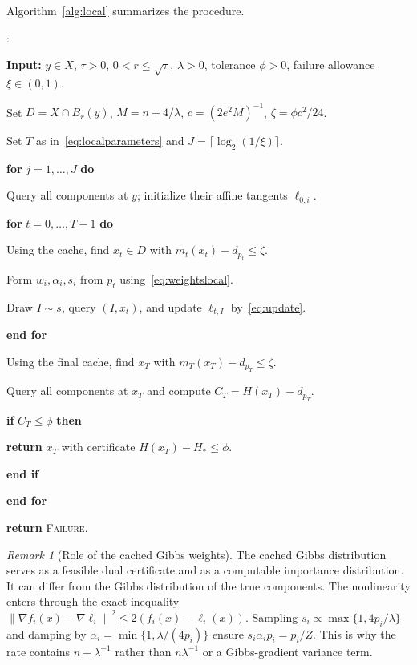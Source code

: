 \documentclass[11pt,a4paper]{article}
\newcounter{algline}
\newlength{\algindent}
\newenvironment{algorithmic}[1][]{%
  \setlength{\algindent}{0pt}\small
  \begin{list}{\arabic{algline}:}{\usecounter{algline}%
    \setlength{\leftmargin}{1.9em}\setlength{\labelsep}{0.5em}%
    \setlength{\itemsep}{2pt}\setlength{\parsep}{0pt}%
    \setlength{\topsep}{4pt}}}{\end{list}}
\newcommand{\State}{\item\hspace*{\algindent}}
\newcommand{\Require}{\item[]\textbf{Input:} }
\newcommand{\For}[1]{\State\textbf{for} #1 \textbf{do}\addtolength{\algindent}{1em}}
\newcommand{\EndFor}{\addtolength{\algindent}{-1em}\State\textbf{end for}}
\newcommand{\If}[1]{\State\textbf{if} #1 \textbf{then}\addtolength{\algindent}{1em}}
\newcommand{\EndIf}{\addtolength{\algindent}{-1em}\State\textbf{end if}}
\newcommand{\Return}{\textbf{return} }
\theoremstyle{definition}\newtheorem{definition}[theorem]{Definition}
\theoremstyle{remark}\newtheorem{remark}[theorem]{Remark}
\newcommand{\norm}[1]{\left\|#1\right\|}
\begin{document}
Algorithm~\ref{alg:local} summarizes the procedure.

\begin{algorithm}[htbp]
\caption{Certified local affine-minorant solver}\label{alg:local}
\begin{algorithmic}[1]
\Require $y\in X$, $\tau>0$, $0<r\le\sqrt\tau$, $\lambda>0$, tolerance $\phi>0$,
failure allowance $\xi\in(0,1)$.
\State Set $D=X\cap B_r(y)$, $M=n+4/\lambda$, $c=(2e^2M)^{-1}$,
$\zeta=\phi c^2/24$.
\State Set $T$ as in~\eqref{eq:localparameters} and
$J=\lceil\log_2(1/\xi)\rceil$.
\For{$j=1,\ldots,J$}
 \State Query all components at $y$; initialize their affine tangents
 $\ell_{0,i}$.
 \For{$t=0,\ldots,T-1$}
  \State Using the cache, find $x_t\in D$ with
  $m_t(x_t)-d_{p_t}\le\zeta$.
  \State Form $w_i,\alpha_i,s_i$ from $p_t$ using~\eqref{eq:weightslocal}.
  \State Draw $I\sim s$, query $(I,x_t)$, and update $\ell_{t,I}$
  by~\eqref{eq:update}.
 \EndFor
 \State Using the final cache, find $x_T$ with
 $m_T(x_T)-d_{p_T}\le\zeta$.
 \State Query all components at $x_T$ and compute $C_T=H(x_T)-d_{p_T}$.
 \If{$C_T\le\phi$}
  \State \Return $x_T$ with certificate $H(x_T)-H_*\le\phi$.
 \EndIf
\EndFor
\State \Return \textsc{Failure}.
\end{algorithmic}
\end{algorithm}

\begin{remark}[Role of the cached Gibbs weights]
The cached Gibbs distribution serves as a feasible dual certificate and
as a computable importance distribution. It can differ from the Gibbs
distribution of the true components. The nonlinearity enters through the exact inequality $\norm{\nabla f_i(x)-\nabla\ell_i}^2\le2(f_i(x)-\ell_i(x))$. Sampling $s_i\propto\max\{1,4p_i/\lambda\}$ and damping by $\alpha_i=\min\{1,\lambda/(4p_i)\}$ ensure $s_i\alpha_i p_i=p_i/Z$. This is why the rate contains $n+\lambda^{-1}$ rather than $n\lambda^{-1}$ or a Gibbs-gradient variance term.
\end{remark}
\end{document}
